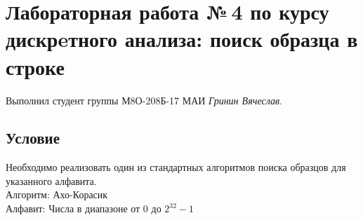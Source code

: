 \documentclass[12pt]{article}
\begin{document}
\section*{Лабораторная работа №\,4 по курсу дискрeтного анализа: поиск образца в строке}

Выполнил студент группы М8О-208Б-17 МАИ \textit{Гринин Вячеслав}.

\subsection*{Условие}
Необходимо реализовать один из стандартных алгоритмов поиска образцов для указанного алфавита.\\
Алгоритм: Ахо-Корасик\\
Алфавит: Числа в диапазоне от $0$ до $2^32 - 1$\\
\end{document}

